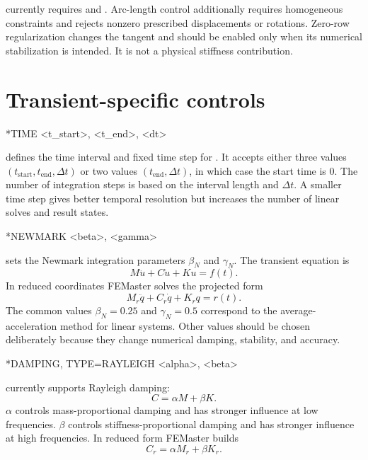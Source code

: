 \begin{warningbox}
 currently requires  and . Arc-length control additionally requires homogeneous constraints and rejects nonzero prescribed displacements or rotations. Zero-row regularization changes the tangent and should be enabled only when its numerical stabilization is intended. It is not a physical stiffness contribution.
\end{warningbox}

\section{Transient-specific controls}

\begin{syntax}
*TIME
<t_start>, <t_end>, <dt>
\end{syntax}

 defines the time interval and fixed time step for . It accepts either three values \((t_\mathrm{start}, t_\mathrm{end}, \Delta t)\) or two values \((t_\mathrm{end}, \Delta t)\), in which case the start time is 0. The number of integration steps is based on the interval length and \(\Delta t\). A smaller time step gives better temporal resolution but increases the number of linear solves and result states.

\begin{syntax}
*NEWMARK
<beta>, <gamma>
\end{syntax}

 sets the Newmark integration parameters \(\beta_N\) and \(\gamma_N\). The transient equation is
\[
M\ddot u + C\dot u + K u = f(t).
\]
In reduced coordinates FEMaster solves the projected form
\[
M_r\ddot q + C_r\dot q + K_r q = r(t).
\]
The common values \(\beta_N=0.25\) and \(\gamma_N=0.5\) correspond to the average-acceleration method for linear systems. Other values should be chosen deliberately because they change numerical damping, stability, and accuracy.

\begin{syntax}
*DAMPING, TYPE=RAYLEIGH
<alpha>, <beta>
\end{syntax}

 currently supports Rayleigh damping:
\[
C = \alpha M + \beta K .
\]
\(\alpha\) controls mass-proportional damping and has stronger influence at low frequencies. \(\beta\) controls stiffness-proportional damping and has stronger influence at high frequencies. In reduced form FEMaster builds
\[
C_r = \alpha M_r + \beta K_r .
\]

